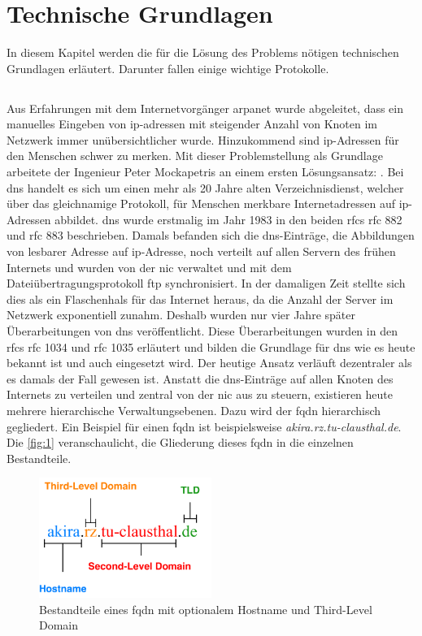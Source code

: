 \documentclass[titlepage]{report}
\begin{document}
\chapter*{Technische Grundlagen}
In diesem Kapitel werden die für die Lösung des Problems nötigen
technischen Grundlagen erläutert. Darunter fallen einige wichtige
Protokolle.
\section*{}
Aus Erfahrungen mit dem Internetvorgänger \gls{arpanet} wurde
abgeleitet, dass ein manuelles Eingeben von \gls{ip}\hyp{}adressen mit
steigender Anzahl von Knoten im Netzwerk immer unübersichtlicher wurde.
Hinzukommend sind \gls{ip}\hyp{}Adressen für den Menschen schwer zu
merken. Mit dieser Problemstellung als Grundlage arbeitete der Ingenieur
Peter Mockapetris an einem ersten Lösungsansatz: .
Bei \gls{dns} handelt es sich um einen mehr als 20 Jahre alten
Verzeichnisdienst, welcher über das gleichnamige Protokoll, für Menschen
merkbare Internetadressen auf \gls{ip}\hyp{}Adressen abbildet.
\gls{dns} wurde erstmalig im Jahr 1983 in den beiden \glspl{rfc}
\gls{rfc} 882\cite{RFC0882} und \gls{rfc} 883\cite{RFC0883} beschrieben.
Damals befanden sich die \gls{dns}\hyp{}Einträge, die Abbildungen von
lesbarer Adresse auf \gls{ip}\hyp{}Adresse, noch verteilt auf
allen Servern des frühen Internets und wurden von der \gls{nic} verwaltet
und mit dem Dateiübertragungsprotokoll \gls{ftp}
synchronisiert\cite{RFC1034}. In der damaligen Zeit stellte sich dies
als ein Flaschenhals für das Internet heraus, da die Anzahl der Server
im Netzwerk exponentiell zunahm. Deshalb wurden nur vier Jahre später
Überarbeitungen von \gls{dns} veröffentlicht. Diese Überarbeitungen
wurden in den \glspl{rfc} \gls{rfc} 1034 und \gls{rfc} 1035 erläutert
und bilden die Grundlage für \gls{dns} wie es heute bekannt ist und auch
eingesetzt wird. Der heutige Ansatz verläuft dezentraler als es damals
der Fall gewesen ist. Anstatt die \gls{dns}\hyp{}Einträge auf allen
Knoten des Internets zu verteilen und zentral von der \gls{nic} aus zu
steuern, existieren heute mehrere hierarchische Verwaltungsebenen. Dazu
wird der \gls{fqdn} hierarchisch gegliedert. Ein Beispiel für einen
\gls{fqdn} ist beispielsweise \emph{akira.rz.tu-clausthal.de}. Die
\autoref{fig:1} veranschaulicht, die Gliederung dieses \gls{fqdn} in die
einzelnen Bestandteile.
\newpage
\begin{figure}[h]
    \centering
    \includegraphics[width=0.5\textwidth]{figures/dnsname.pdf}
    \caption{Bestandteile eines \gls{fqdn} mit optionalem Hostname und Third-Level
    Domain}\label{fig:1}
\end{figure}
\end{document}
